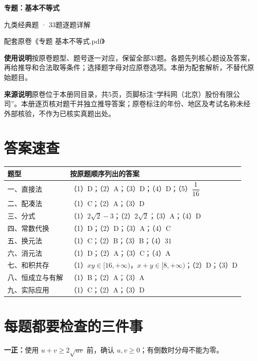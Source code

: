 \documentclass[UTF8,a4paper,11pt]{ctexart}
\begin{document}
\begin{center}
{\LARGE\bfseries 专题：基本不等式}\par\vspace{8pt}
{\Large 九类经典题 · 33题逐题详解}\par\vspace{6pt}
{\small 配套原卷《专题 基本不等式.pdf》}
\end{center}
\vspace{5pt}
\textbf{使用说明}\quad 按原卷题型、题号逐一对应，保留全部33题。各题先列核心题设及答案，再给推导和合法取等条件；选择题字母对应原卷选项。本册为配套解析，不替代原始题目。

\textbf{来源说明}\quad 原卷位于本册同目录，共5页，页脚标注“学科网（北京）股份有限公司”。本册逐页核对题干并独立推导答案；原卷标注的年份、地区及考试名称未经外部核验，不作为已核实真题出处。

\section*{答案速查}
\renewcommand{\arraystretch}{1.7}
\begin{tabular}{@{}p{}p{}@{}}
\toprule
题型 & 按原题顺序列出的答案 \\
\midrule
一、直接法 & （1）D；（2）A；（3）D；（4）D；（5）$\dfrac1{16}$ \\
二、配凑法 & （1）C；（2）A；（3）D \\
三、分式 & （1）$2\sqrt2-3$；（2）$2\sqrt2$；（3）A；（4）D \\
四、常数代换 & （1）D；（2）D；（3）A；（4）C \\
五、换元法 & （1）C；（2）B；（3）B；（4）$31$ \\
六、消元法 & （1）D；（2）A；（3）C；（4）A \\
七、和积共存 & （1）$xy\in[16,+\infty)$，$x+y\in[8,+\infty)$；（2）D；（3）D \\
八、恒成立与有解 & （1）B；（2）A；（3）A \\
九、实际应用 & （1）C；（2）A；（3）D \\
\bottomrule
\end{tabular}\par\vspace{6pt}

\section*{每题都要检查的三件事}
\textbf{一正：}使用 $u+v\ge2\sqrt{uv}$ 前，确认 $u,v\ge0$；有倒数时分母不能为零。
\end{document}
